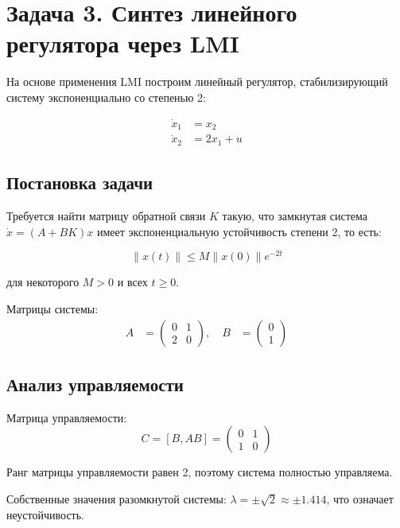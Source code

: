 \section*{Задача 3. Синтез линейного регулятора через LMI}

На основе применения LMI построим линейный регулятор, стабилизирующий систему экспоненциально со степенью 2:

\begin{align}
\dot{x}_1 &= x_2 \\
\dot{x}_2 &= 2x_1 + u
\end{align}

\subsection*{Постановка задачи}

Требуется найти матрицу обратной связи $K$ такую, что замкнутая система $\dot{x} = (A + BK)x$ имеет экспоненциальную устойчивость степени 2, то есть:

\begin{equation}
\|x(t)\| \leq M\|x(0)\|e^{-2t}
\end{equation}

для некоторого $M > 0$ и всех $t \geq 0$.

Матрицы системы:
\begin{align}
A &= \begin{pmatrix} 0 & 1 \\ 2 & 0 \end{pmatrix}, \quad
B &= \begin{pmatrix} 0 \\ 1 \end{pmatrix}
\end{align}

\subsection*{Анализ управляемости}

Матрица управляемости:
\begin{equation}
C = [B, AB] = \begin{pmatrix} 0 & 1 \\ 1 & 0 \end{pmatrix}
\end{equation}

Ранг матрицы управляемости равен 2, поэтому система полностью управляема.

Собственные значения разомкнутой системы: $\lambda = \pm\sqrt{2} \approx \pm 1.414$, что означает неустойчивость.

